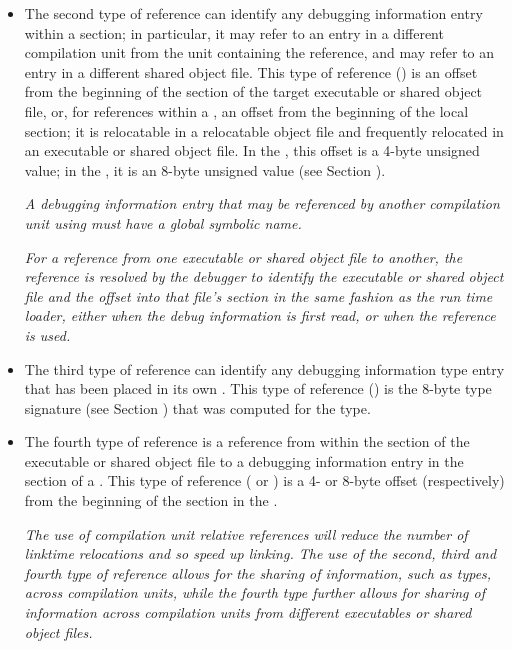 \begin{itemize}
\begin{itemize}
\item
The second type of reference can identify any debugging
information entry within a 
\dotdebuginfo{} section; in particular,
it may refer to an entry in a different compilation unit
from the unit containing the reference, and may refer to an
entry in a different shared object file.  This type of reference
(\DWFORMrefaddrTARG) 
is an offset from the beginning of the
\dotdebuginfo{} 
section of the target executable or shared object file, or, for
references within a , 
an offset from the beginning of the local \dotdebuginfo{} section;
it is relocatable in a relocatable object file and frequently
relocated in an executable or shared object file. 
\db
In the 
\thirtytwobitdwarfformat, this offset is a 4-byte unsigned value; 
in the \sixtyfourbitdwarfformat, it is an 8-byte unsigned value 
(see Section ).

\textit{A debugging information entry that may be referenced by
another compilation unit using 
\DWFORMrefaddr{} must have a global symbolic name.}

\textit{For a reference from one executable or shared object file to
another, the reference is resolved by the debugger to identify
the executable or shared object file and the offset into that
file\textquoteright s \dotdebuginfo{}
section in the same fashion as the run
time loader, either when the debug information is first read,
or when the reference is used.}

\item
The third type of reference can identify any debugging
information type entry that has been placed in its own
. This type of 
reference (\DWFORMrefsigeightTARG) is the
8-byte type signature 
(see Section ) 
that was computed for the type. 

\item
The fourth type of reference is a reference from within the 
\dotdebuginfo{} section of the executable or shared object file to
a debugging information entry in the \dotdebuginfo{} section of 
a .
This type of reference (\DWFORMrefsupfourTARG{}
or \DWFORMrefsupeightTARG{}) is a 4- or 8-byte offset (respectively) 
from the beginning of the \dotdebuginfo{} section in the 
.

\textit{The use of compilation unit relative references will reduce the
number of link\dash time relocations and so speed up linking. The
use of the second, third and fourth type of reference allows for the
sharing of information, such as types, across compilation
units, while the fourth type further allows for sharing of information 
across compilation units from different executables or shared object files.}


\end{itemize}
\end{itemize}
